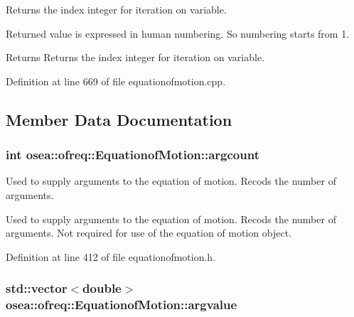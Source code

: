 Returns the index integer for iteration on variable. 

Returned value is expressed in human numbering. So numbering starts from 1. \begin{DoxyReturn}{Returns}
Returns the index integer for iteration on variable. 
\end{DoxyReturn}


Definition at line 669 of file equationofmotion.\-cpp.



\subsection{Member Data Documentation}
\hypertarget{classosea_1_1ofreq_1_1_equationof_motion_a13a15811fd575ac0fccf0d463218657b}{
\subsubsection[{argcount}]{\setlength{\rightskip}{0pt plus 5cm}int osea\-::ofreq\-::\-Equationof\-Motion\-::argcount\hspace{0.3cm}{\ttfamily [protected]}}}\label{classosea_1_1ofreq_1_1_equationof_motion_a13a15811fd575ac0fccf0d463218657b}


Used to supply arguments to the equation of motion. Recods the number of arguments. 

Used to supply arguments to the equation of motion. Recods the number of arguments. Not required for use of the equation of motion object. 

Definition at line 412 of file equationofmotion.\-h.

\hypertarget{classosea_1_1ofreq_1_1_equationof_motion_a1a9bf7f3460368c102aa8d4edec9b500}{
\subsubsection[{argvalue}]{\setlength{\rightskip}{0pt plus 5cm}std\-::vector$<$double$>$ osea\-::ofreq\-::\-Equationof\-Motion\-::argvalue\hspace{0.3cm}{\ttfamily [protected]}}}\label{classosea_1_1ofreq_1_1_equationof_motion_a1a9bf7f3460368c102aa8d4edec9b500}


